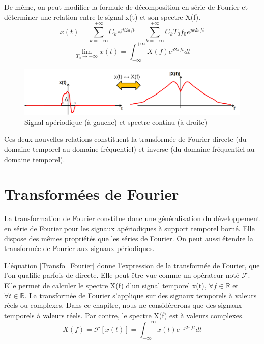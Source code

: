 	De même, on peut modifier la formule de décomposition en série de Fourier et déterminer une relation entre le signal x(t) et son spectre X(f).
	\begin{equation*}
	x(t)=\sum_{k=-\infty}^{+\infty}C_ke^{jk2\pi ft}=\sum_{k=-\infty}^{+\infty}C_k T_0 f_0 e^{jk2\pi ft}
	\end{equation*}
	\begin{equation}\label{Deriv_Transfo_Fourier_inverse}
	\lim_{T_0 \to +\infty}x(t)=\int_{-\infty}^{+\infty}X(f)e^{j2\pi f t}dt
	\end{equation}
	
	\begin{figure}[h!]
		\centering
		\includegraphics[scale=0.5]{images/Serie_To_Transfo_Fourier_3.png}
		\caption{Signal apériodique (à gauche) et spectre continu (à droite)}	
		\label{Fig:Serie_To_Transfo_Fourier_3} 
	\end{figure}
	
	Ces deux nouvelles relations constituent la transformée de Fourier directe (du domaine temporel au domaine fréquentiel) et inverse (du domaine fréquentiel au domaine temporel).\\ 
	
	
	
	\section{Transformées de Fourier}
	
	La transformation de Fourier constitue donc une généralisation du développement en série de Fourier pour les signaux apériodiques à support temporel borné. Elle dispose des mêmes propriétés que les séries de Fourier. On peut aussi étendre la transformée de Fourier aux signaux périodiques.
	
	L'équation \ref{Transfo_Fourier} donne l'expression de la transformée de Fourier, que l'on qualifie parfois de directe. Elle peut être vue comme un opérateur noté $\mathcal{F}$. Elle permet de calculer le spectre X(f) d'un signal temporel x(t), $\forall f \in \mathbb{R}$ et $\forall t \in \mathbb{R}$. La transformée de Fourier s'applique sur des signaux temporels à valeurs réels ou complexes. Dans ce chapitre, nous ne considérerons que des signaux temporels à valeurs réels. Par contre, le spectre X(f) est à valeurs complexes. 
	\begin{equation}\label{Transfo_Fourier}
	X(f)=\mathcal{F}[x(t)]=\int_{-\infty}^{+\infty}x(t)e^{-j2\pi f t}dt
	\end{equation}
	
